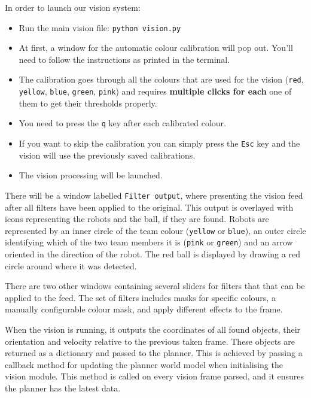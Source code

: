 In order to launch our vision system:
\begin{itemize}
\item Run the main vision file: \texttt{python vision.py}
\item At first, a window for the automatic colour calibration will pop out. You'll need to follow the instructions as printed in the terminal. 
\item The calibration goes through all the colours that are used for the vision (\texttt{red}, \texttt{yellow}, \texttt{blue}, \texttt{green}, \texttt{pink}) and requires \textbf{multiple clicks for each} one of them to get their thresholds properly.
\item You need to press the \texttt{q} key after each calibrated colour. 
\item If you want to skip the calibration you can simply press the \texttt{Esc} key and the vision will use the previously saved calibrations.
\item The vision processing will be launched.
\end{itemize}

There will be a window labelled \texttt{Filter output}, where presenting the vision feed after all filters have been applied to the original. This output is overlayed with icons representing the robots and the ball, if they are found. Robots are represented by an inner circle of the team colour (\texttt{yellow} or \texttt{blue}), an outer circle identifying which of the two team members it is (\texttt{pink} or \texttt{green}) and an arrow oriented in the direction of the robot.  The red ball is displayed by drawing a red circle around where it was detected. 

There are two other windows containing several sliders for filters that that can be applied to the feed. The set of filters includes masks for specific colours, a manually configurable colour mask, and apply different effects to the frame.

When the vision is running, it outputs the coordinates of all found objects, their orientation and velocity relative to the previous taken frame. These objects are returned as a dictionary and passed to the planner. This is achieved by passing a callback method for updating the planner world model when initialising the vision module. This method is called on every vision frame parsed, and it ensures the planner has the latest data.